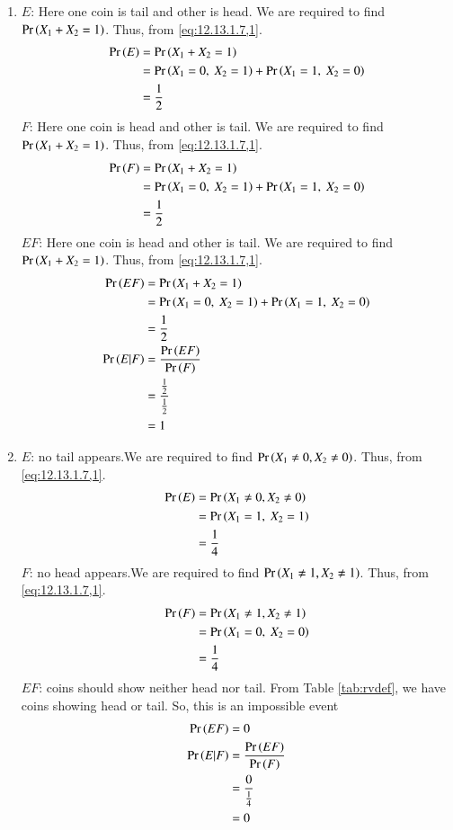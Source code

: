 \documentclass[journal,11pt,twocolumn]{IEEEtran}
\begin{document}
    \begin{enumerate}
        \item $E$: Here one coin is tail and other is head. We are required to find $\Pr\left(X_1+X_2=1\right)$. Thus, from \eqref{eq:12.13.1.7,1}.
        \begin{align}
        \Pr\left(E\right)&=\Pr\left(X_1+X_2=1\right)\\
        &=\Pr\left(X_1=0,\ X_2=1\right)+\Pr\left(X_1=1,\ X_2=0\right)\\
        &=\frac{1}{2}
        \end{align}
        $F$: Here one coin is head and other is tail. We are required to find $\Pr\left(X_1+X_2=1\right)$. Thus, from \eqref{eq:12.13.1.7,1}.
        \begin{align}
        \Pr\left(F\right)&=\Pr\left(X_1+X_2=1\right)\\
        &=\Pr\left(X_1=0,\ X_2=1\right)+\Pr\left(X_1=1,\ X_2=0\right)\\
        &=\frac{1}{2}
        \end{align}
  	$EF$: Here one coin is head and other is tail. We are required to find $\Pr\left(X_1+X_2=1\right)$. Thus, from \eqref{eq:12.13.1.7,1}.
\begin{align}
        \Pr\left(EF\right)&=\Pr\left(X_1+X_2=1\right)\\
        &=\Pr\left(X_1=0,\ X_2=1\right)+\Pr\left(X_1=1,\ X_2=0\right)\\
        &=\frac{1}{2}\\
        \Pr\left(E|F\right)&=\frac{\Pr\left(EF\right)}{\Pr\left(F\right)}\\
        &=\frac{\frac{1}{2}}{\frac{1}{2}}\\
        &=1
\end{align}
\item $E$: no tail appears.We are required to find $\Pr\left(X_1\neq0,X_2\neq0\right)$. Thus, from \eqref{eq:12.13.1.7,1}.
\begin{align}
\Pr\left(E\right)&=\Pr\left(X_1\neq0,X_2\neq0\right)\\
&=\Pr\left(X_1=1,\ X_2=1\right)\\
&=\frac{1}{4}
        \end{align}
        $F$: no head appears.We are required to find $\Pr\left(X_1\neq1,X_2\neq1\right)$. Thus, from \eqref{eq:12.13.1.7,1}.
        \begin{align}
        \Pr\left(F\right)&=\Pr\left(X_1\neq1,X_2\neq1\right)\\
        &=\Pr\left(X_1=0,\ X_2=0\right)\\
        &=\frac{1}{4}
\end{align}
$EF$: coins should show neither head nor tail. From Table \ref{tab:rvdef}, we have coins showing head or tail. So, this is an impossible event
\begin{align}
\Pr\left(EF\right)&=0\\
\Pr\left(E|F\right)&=\frac{\Pr\left(EF\right)}{\Pr\left(F\right)}\\
&=\frac{0}{\frac{1}{4}}\\
&=0
\end{align}
        
        
     
    \end{enumerate}
\end{document}
